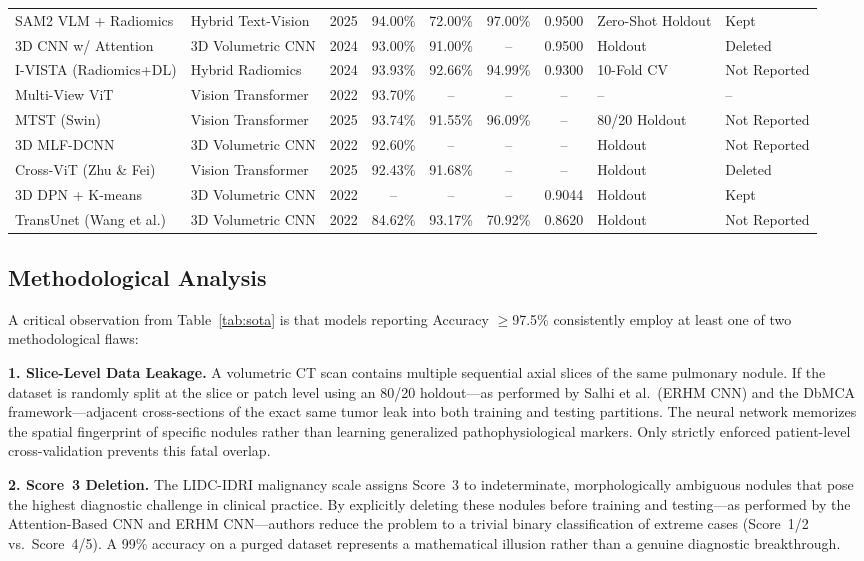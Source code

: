 \documentclass[AMA,STIX1COL]{WileyNJD-v2}
\begin{document}
\begin{longtable}{p{3.2cm} p{2.1cm} c c c c c p{1.8cm} p{1.7cm}}
SAM2 VLM + Radiomics & Hybrid Text-Vision & 2025 & 94.00\% & 72.00\% & 97.00\% & 0.9500 & Zero-Shot Holdout & Kept \\
3D CNN w/ Attention & 3D Volumetric CNN & 2024 & 93.00\% & 91.00\% & -- & 0.9500 & Holdout & Deleted \\
I-VISTA (Radiomics+DL) & Hybrid Radiomics & 2024 & 93.93\% & 92.66\% & 94.99\% & 0.9300 & 10-Fold CV & Not Reported \\
Multi-View ViT & Vision Transformer & 2022 & 93.70\% & -- & -- & -- & -- & -- \\
MTST (Swin) & Vision Transformer & 2025 & 93.74\% & 91.55\% & 96.09\% & -- & 80/20 Holdout & Not Reported \\
3D MLF-DCNN & 3D Volumetric CNN & 2022 & 92.60\% & -- & -- & -- & Holdout & Not Reported \\
Cross-ViT (Zhu \& Fei) & Vision Transformer & 2025 & 92.43\% & 91.68\% & -- & -- & Holdout & Deleted \\
3D DPN + K-means & 3D Volumetric CNN & 2022 & -- & -- & -- & 0.9044 & Holdout & Kept \\
TransUnet (Wang et al.) & 3D Volumetric CNN & 2022 & 84.62\% & 93.17\% & 70.92\% & 0.8620 & Holdout & Not Reported \\
\end{longtable}

\subsection{Methodological Analysis}

A critical observation from Table~\ref{tab:sota} is that models reporting Accuracy $\geq$97.5\% consistently employ at least one of two methodological flaws:

\textbf{1. Slice-Level Data Leakage.} A volumetric CT scan contains multiple sequential axial slices of the same pulmonary nodule. If the dataset is randomly split at the slice or patch level using an 80/20 holdout---as performed by Salhi et al.\ (ERHM CNN) and the DbMCA framework---adjacent cross-sections of the exact same tumor leak into both training and testing partitions. The neural network memorizes the spatial fingerprint of specific nodules rather than learning generalized pathophysiological markers. Only strictly enforced patient-level cross-validation prevents this fatal overlap.

\textbf{2. Score~3 Deletion.} The LIDC-IDRI malignancy scale assigns Score~3 to indeterminate, morphologically ambiguous nodules that pose the highest diagnostic challenge in clinical practice. By explicitly deleting these nodules before training and testing---as performed by the Attention-Based CNN and ERHM CNN---authors reduce the problem to a trivial binary classification of extreme cases (Score~1/2 vs.\ Score~4/5). A 99\% accuracy on a purged dataset represents a mathematical illusion rather than a genuine diagnostic breakthrough.
\end{document}
